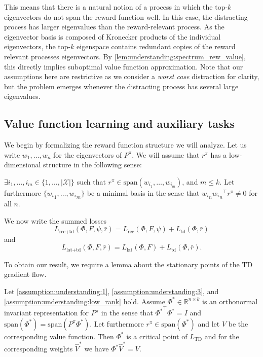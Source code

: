 This means that there is a natural notion of a process in which the top-$k$ eigenvectors do not span the reward function well.
In this case, the distracting process has larger eigenvalues than the reward-relevant process.
As the eigenvector basis is composed of Kronecker products of the individual eigenvectors, the top-$k$ eigenspace contains redundant copies of the reward relevant processes eigenvectors.
By \autoref{lem:understanding:spectrum_rew_value}, this directly implies suboptimal value function approximation.
Note that our assumptions here are restrictive as we consider a \emph{worst case} distraction for clarity, but the problem emerges whenever the distracting process has several large eigenvalues.

\subsection{Value function learning and auxiliary tasks}

We begin by formalizing the reward function structure we will analyze. 
Let us write $w_1,\dots,w_n$ for the eigenvectors of $P^\pi$. 
We will assume that $r^\pi$ has a low-dimensional structure in the following sense: 

\begin{assumption}\label{assumption:understanding:low_rank}
    $\exists i_1,\dots,i_m \in \{1,\dots,|\mathcal{X}|\}$ such that $r^\pi \in \mathrm{span}(w_{i_1},\dots,w_{i_m})$, and $m\leq k.$ Let furthermore $\{{w_i}_1,\dots,{w_i}_m\}$ be a minimal basis in the sense that ${w_i}_n {{w_i}_n}^\top r^\pi \neq 0$ for all $n$. 
\end{assumption}
We now write the summed losses $$L_{\text{rec}+\text{td}}(\Phi,F,\psi,\bar{r})= L_\text{rec}(\Phi, F, \psi)+L_\text{td}(\Phi, \bar r)$$ and $$L_{\text{lat}+\text{td}}(\Phi,F,\bar{r})= L_\text{lat}(\Phi, F)+L_\text{td}(\Phi, \bar r).$$ 

To obtain our result, we require a lemma about the stationary points of the TD gradient flow.
\begin{lemma}\label{prop:td_critical}
Let \autoref{assumption:understanding:1}, \autoref{assumption:understanding:3}, and \autoref{assumption:understanding:low_rank} hold.
    Assume $\Phi^* \in \mathbb{R}^{n \times k}$ is an orthonormal invariant representation for $P^\pi$ in the sense that ${\Phi^*}^\top \Phi^* = I$ and $\text{span}(\Phi^*) = \text{span}(P^\pi \Phi^*)$. Let furthermore  $r^\pi \in \text{span}(\Phi^*)$ and let $V$ be the corresponding value function. Then $\Phi^*$ is a critical point of $L_\text{TD}$ and for the corresponding weights $\hat{V}^*$ we have $\Phi^*\hat{V}^* = V$.
\end{lemma}

